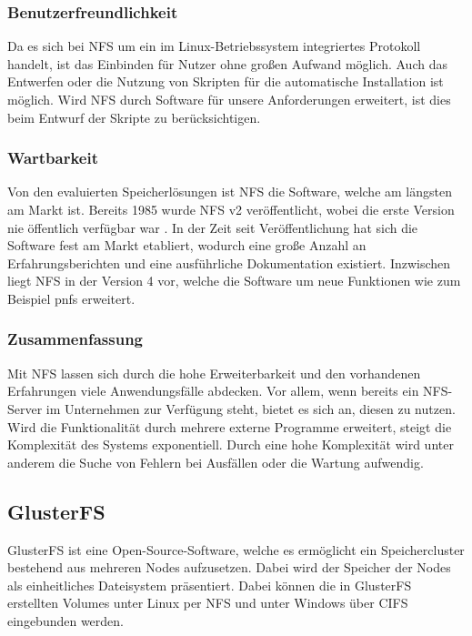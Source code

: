 \subsubsection{Benutzerfreundlichkeit}
Da es sich bei \ac{NFS} um ein im Linux-Betriebssystem integriertes Protokoll handelt, ist das Einbinden für Nutzer ohne großen Aufwand möglich. Auch das Entwerfen oder die Nutzung von Skripten für die automatische Installation ist möglich. Wird \ac{NFS} durch Software für unsere Anforderungen erweitert, ist dies beim Entwurf der Skripte zu berücksichtigen.

\subsubsection{Wartbarkeit}
Von den evaluierten Speicherlösungen ist \ac{NFS} die Software, welche am längsten am Markt ist. Bereits 1985 wurde \ac{NFS} v2 veröffentlicht, wobei die erste Version nie öffentlich verfügbar war \cite{Pawlowski1994NFSImplementation}. In der Zeit seit Veröffentlichung hat sich die Software fest am Markt etabliert, wodurch eine große Anzahl an Erfahrungsberichten und eine ausführliche Dokumentation existiert. Inzwischen liegt \ac{NFS} in der Version 4 vor, welche die Software um neue Funktionen wie zum Beispiel pnfs erweitert.

\subsubsection{Zusammenfassung}
Mit \ac{NFS} lassen sich durch die hohe Erweiterbarkeit und den vorhandenen Erfahrungen viele Anwendungsfälle abdecken. Vor allem, wenn bereits ein \ac{NFS}-Server im Unternehmen zur Verfügung steht, bietet es sich an, diesen zu nutzen. Wird die Funktionalität durch mehrere externe Programme erweitert, steigt die Komplexität des Systems exponentiell. Durch eine hohe Komplexität wird unter anderem die Suche von Fehlern bei Ausfällen oder die Wartung aufwendig.
% 

\subsection{GlusterFS}
GlusterFS ist eine Open-Source-Software, welche es ermöglicht ein Speichercluster bestehend aus mehreren Nodes aufzusetzen. Dabei wird der Speicher der Nodes als einheitliches Dateisystem präsentiert. Dabei können die in GlusterFS erstellten Volumes unter Linux per NFS und unter Windows über CIFS eingebunden werden.

